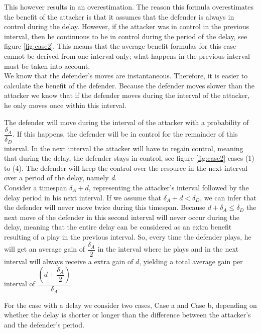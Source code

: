 This however results in an overestimation. 
The reason this formula overestimates the benefit of the attacker is that it assumes that the defender is always in control during the delay. However, if the attacker was in control in the previous interval, then he continuous to be in control during the period of the delay, see figure \ref{fig:case2}. This means that the average benefit formulas for this case cannot be derived from one interval only; what happens in the previous interval must be taken into account. \\

We know that the defender's moves are instantaneous. Therefore, it is easier to calculate the benefit of the defender. Because the defender moves slower than the attacker we know that if the defender moves during the interval of the attacker, he only moves once within this interval.

The defender will move during the interval of the attacker with a probability of $\dfrac{\delta_{A}}{\delta_{D}} $. If this happens, the defender will be in control for the remainder of this interval. In the next interval the attacker will have to regain control, meaning that during the delay, the defender stays in control, see figure \ref{fig:case2} cases (1) to (4). The defender will keep the control over the resource in the next interval over a period of the delay, namely \textit{d}. \\

Consider a timespan $\delta_{A} + d$, representing the attacker's interval followed by the delay period in his next interval. If we assume that $\delta_{A}+d<\delta_{D}$, we can infer that the defender will never move twice during this timespan.
Because $d + \delta_{A} \leq \delta_{D}$ the next move of the defender in this second interval will never occur during the delay, meaning that the entire delay can be considered as an extra benefit resulting of a play in the previous interval. 
So, every time the defender plays, he will get an average gain of $\dfrac{\delta_{A}}{2}$ in the interval where he plays and in the next interval will always receive a extra gain of $d$, yielding a total average gain per interval of
$\dfrac{(d+\dfrac{\delta_{A}}{2})}{\delta_{A}}$

For the case with a delay we consider two cases, Case a and Case b, depending on whether the delay is shorter or longer than the difference between the attacker's and the defender's period.  \\

